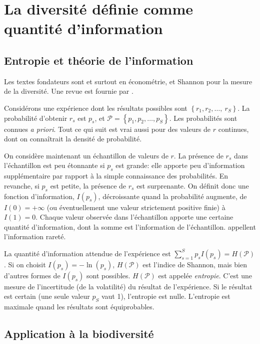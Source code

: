\documentclass[a4paper]{article}
\begin{document}
\section{La diversité définie comme quantité d'information}

\subsection{Entropie et théorie de l'information}

Les textes fondateurs sont \cite{Davis1941} et surtout \cite{Theil1967} en économétrie, et Shannon \citep{Shannon1948, Shannon1963} pour la mesure de la diversité.
Une revue est fournie par \cite{Maasoumi1993}.

Considérons une expérience dont les résultats possibles sont $\left\{r_1,r_2,\dots ,\ r_S\right\}$.
La probabilité d'obtenir $r_s$ est $p_s$, et ${\mathcal P}\allowbreak=\left\{p_1,p_2,\dots,p_S\right\}$.
Les probabilités sont connues \emph{a priori}.
Tout ce qui suit est vrai aussi pour des valeurs de $r$ continues, dont on connaîtrait la densité de probabilité.

On considère maintenant un échantillon de valeurs de $r$.
La présence de $r_s$ dans l'échantillon est peu étonnante si $p_s$ est grande: elle apporte peu d'information supplémentaire par rapport à la simple connaissance des probabilités.
En revanche, si $p_s$ est petite, la présence de $r_s$ est surprenante.
On définit donc une fonction d'information, $I(p_s)$, décroissante quand la probabilité augmente, de $I(0)=+\infty $ (ou éventuellement une valeur strictement positive finie) à $I(1)=0$.
Chaque valeur observée dans l'échantillon apporte une certaine quantité d'information, dont la somme est l'information de l'échantillon.
\cite{Patil1982} appellent l'information \og rareté\fg{}.

La quantité d'information attendue de l'expérience est $\sum^S_{s=1}{p_s I(p_s) = H({\mathcal P})}$.
Si on choisit $I\left(p_s\right)=-\ln\left(p_s\right)$, $H\left({\mathcal P}\right)$ est l'indice de Shannon, mais bien d'autres formes de $I\left(p_s\right)$ sont possibles.
$H\left({\mathcal P}\right)$ est appelée \emph{entropie}.
C'est une mesure de l'incertitude (de la volatilité) du résultat de l'expérience.
Si le résultat est certain (une seule valeur $p_S$ vaut 1), l'entropie est nulle.
L'entropie est maximale quand les résultats sont équiprobables.




\subsection{Application à la biodiversité}
\end{document}
